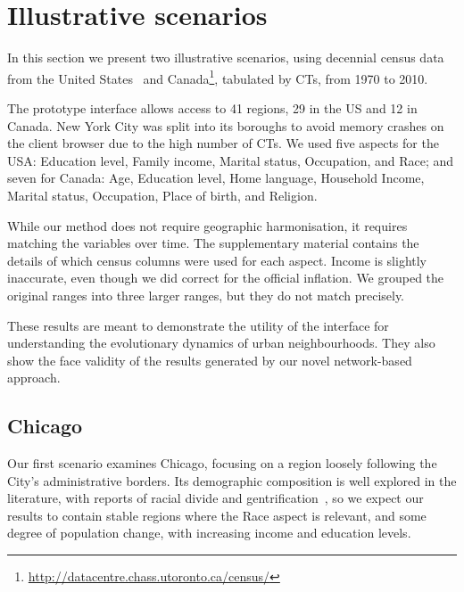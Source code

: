 \section{Illustrative scenarios}
\label{sec:study}

In this section we present two illustrative scenarios, using decennial census
data from the United States~\citep{nhgis} and
Canada\footnote{\url{http://datacentre.chass.utoronto.ca/census/}}, tabulated by
CTs,  from 1970 to 2010. 

The prototype interface allows access to 41 regions, 29
in the US and 12 in Canada. New York City was split into its boroughs to avoid
memory crashes on the client browser due to the high number of CTs.  We used
five aspects for the USA: Education level, Family income, Marital status,
Occupation, and Race; and seven for Canada: Age, Education level, Home language,
Household Income, Marital status, Occupation, Place of birth, and Religion. 

While our method does not require geographic harmonisation, it requires matching
the variables over time. The supplementary material contains the details of
which census columns were used for each aspect. Income is slightly inaccurate,
even though we did correct for the official inflation. We grouped the original
ranges into three larger ranges, but they do not match precisely.

These results are meant to demonstrate the utility of the interface for
understanding the evolutionary dynamics of urban neighbourhoods. They also show
the face validity of the results generated by our novel network-based approach.

\subsection{Chicago}
Our first scenario examines Chicago, focusing on a region loosely following the
City's administrative borders. Its demographic composition is well explored in
the literature, with reports of racial divide and
gentrification~\citep{Delmelle2016,Delmelle2017,Hwang2014}, so we expect our
results to contain stable regions where the Race aspect is relevant, and some
degree of population change, with increasing income and education levels. 


